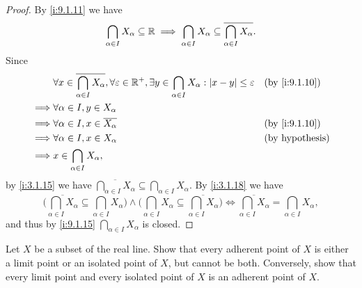 \begin{proof}
  By \cref{i:9.1.11} we have
  \[
    \bigcap_{\alpha \in I} X_{\alpha} \subseteq \mathbb{R} \implies \bigcap_{\alpha \in I} X_{\alpha} \subseteq \overline{\bigcap_{\alpha \in I} X_{\alpha}}.
  \]
  Since
  \begin{align*}
             & \forall x \in \overline{\bigcap_{\alpha \in I} X_{\alpha}}, \forall \varepsilon \in \R^+, \exists y \in \bigcap_{\alpha \in I} X_{\alpha} : \abs{x - y} \leq \varepsilon &  & \by{i:9.1.10}          \\
    \implies & \forall \alpha \in I, y \in X_{\alpha}                                                                                                                                                               \\
    \implies & \forall \alpha \in I, x \in \overline{X_{\alpha}}                                                                                                                        &  & \by{i:9.1.10}          \\
    \implies & \forall \alpha \in I, x \in X_{\alpha}                                                                                                                                   &  & \text{(by hypothesis)} \\
    \implies & x \in \bigcap_{\alpha \in I} X_{\alpha},
  \end{align*}
  by \cref{i:3.1.15} we have \(\overline{\bigcap_{\alpha \in I} X_{\alpha}} \subseteq \bigcap_{\alpha \in I} X_{\alpha}\).
  By \cref{i:3.1.18} we have
  \[
    \bigg(\overline{\bigcap_{\alpha \in I} X_{\alpha}} \subseteq \bigcap_{\alpha \in I} X_{\alpha}\bigg) \land \bigg(\bigcap_{\alpha \in I} X_{\alpha} \subseteq \overline{\bigcap_{\alpha \in I} X_{\alpha}}\bigg) \iff \overline{\bigcap_{\alpha \in I} X_{\alpha}} = \bigcap_{\alpha \in I} X_{\alpha},
  \]
  and thus by \cref{i:9.1.15} \(\bigcap_{\alpha \in I} X_{\alpha}\) is closed.
\end{proof}

\begin{ex}\label{i:ex:9.1.9}
  Let \(X\) be a subset of the real line.
  Show that every adherent point of \(X\) is either a limit point or an isolated point of \(X\), but cannot be both.
  Conversely, show that every limit point and every isolated point of \(X\) is an adherent point of \(X\).
\end{ex}

